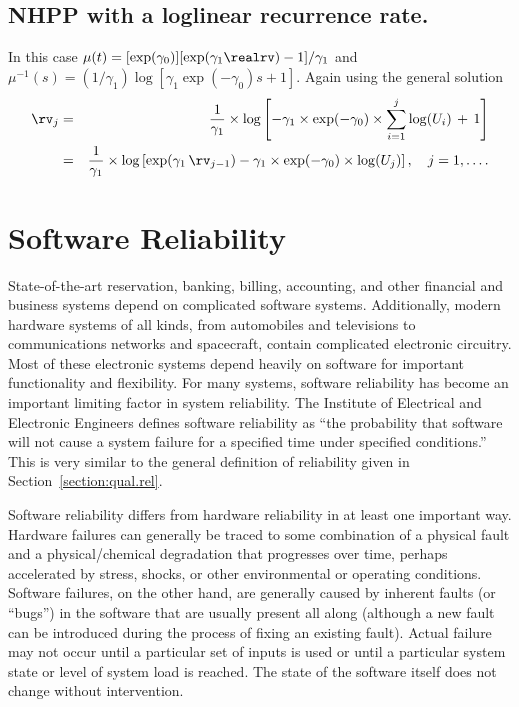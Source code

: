 \subsection{NHPP with a loglinear recurrence rate.}
In this case $\mu(t)=[\exp(\gamma_{0})]  [\exp(\gamma_{1} \realrv)-1 ]/\gamma_{1}$ and $\mu^{-1}(s)=(1/\gamma_{1}) \log \left [
				    \gamma_{1} \exp(-\gamma_{0}) s +1
				    \right ]$. 
Again using the general solution
\begin{eqnarray*}
\rv_{j}&=&
\frac{1}{\gamma_{1}} \times
\log\left [
-\gamma_{1}\times \exp(-\gamma_{0}) \times \sum_{i=1}^{j} \log(U_{i})
\,+\,1
\right ]
\\
&=&
\frac{1}{\gamma_{1}} 
\times
\log\left [
\exp(\gamma_{1} \,\rv_{j-1})
-\gamma_{1}\times \exp(-\gamma_{0}) \times  \log(U_{j})
\right ]
, \quad j=1, \dots .
\end{eqnarray*}

\section{Software Reliability}
\label{section:software.reliability}
State-of-the-art reservation, banking, billing, accounting, and
other financial and business systems depend on complicated software
systems.  Additionally, modern hardware systems of all kinds, from
automobiles and televisions to communications networks and
spacecraft, contain complicated electronic circuitry.  Most of these
electronic systems depend heavily on software for important
functionality and flexibility. For many systems, software
reliability has become an important limiting factor in system
reliability.  The Institute of Electrical and Electronic Engineers
defines software reliability as ``the probability that software will
not cause a system failure for a specified time under specified
conditions.''  This is very similar to the general definition of
reliability given in Section~\ref{section:qual.rel}.

Software reliability differs from hardware reliability in at least
one important way.  Hardware failures can generally be traced to
some combination of a physical fault and a physical/chemical
degradation that progresses over time, perhaps accelerated by
stress, shocks, or other environmental or operating conditions.
Software failures, on the other hand, are generally caused by
inherent faults (or ``bugs'') in the software that are usually
present all along (although a new fault can be introduced during the
process of fixing an existing fault).  Actual failure may not occur
until a particular set of inputs is used or until a particular
system state or level of system load is reached. The state of the
software itself does not change without intervention.

